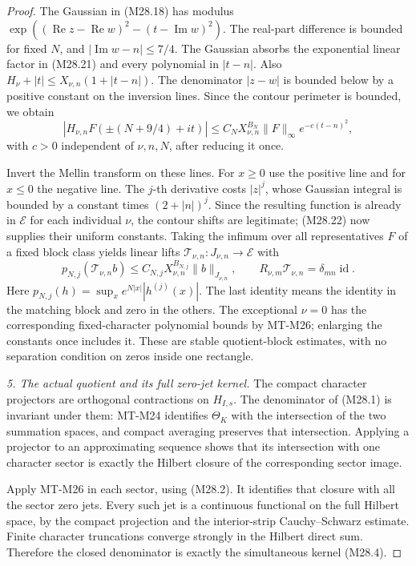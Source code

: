 \begin{proof}
The Gaussian in (M28.18) has modulus
\(\exp((\operatorname{Re}z-\operatorname{Re}w)^2
       -(t-\operatorname{Im}w)^2)\).
The real-part difference is bounded for fixed
\(N\), and
\(|\operatorname{Im}w-n|\le7/4\). The Gaussian
absorbs the exponential linear factor in
(M28.21) and every polynomial in \(|t-n|\).
Also \(H_\nu+|t|\le X_{\nu,n}(1+|t-n|)\).
The denominator \(|z-w|\) is bounded below
by a positive constant on the inversion lines.
Since the contour perimeter is bounded, we obtain
\[
 |H_{\nu,n}F(\pm(N+9/4)+it)|
 \le C_N X_{\nu,n}^{B_N}\|F\|_\infty
                              e^{-c(t-n)^2},                 \tag{M28.22}
\]
with \(c>0\) independent of \(\nu,n,N\), after
reducing it once.

Invert the Mellin transform on these lines.
For \(x\ge0\) use the positive line and for
\(x\le0\) the negative line. The \(j\)-th
derivative costs \(|z|^j\), whose Gaussian
integral is bounded by a constant times
\((2+|n|)^j\). Since the resulting function
is already in \(\mathcal E\) for each
individual \(\nu\), the contour shifts are
legitimate; (M28.22) now supplies their
uniform constants. Taking the infimum over
all representatives \(F\) of a fixed block
class yields linear lifts
\(\mathcal T_{\nu,n}:J_{\nu,n}\to\mathcal E\)
with
\[
 p_{N,j}(\mathcal T_{\nu,n}b)
       \le C_{N,j}X_{\nu,n}^{B_{N,j}}\|b\|_{J_{\nu,n}},
 \qquad R_{\nu,m}\mathcal T_{\nu,n}=\delta_{mn}\operatorname{id}.
                                                               \tag{M28.23}
\]
Here \(p_{N,j}(h)=\sup_x e^{N|x|}|h^{(j)}(x)|\).
The last identity means the identity in the
matching block and zero in the others.
The exceptional \(\nu=0\) has the corresponding
fixed-character polynomial bounds by MT-M26;
enlarging the constants once includes it.
These are stable quotient-block estimates,
with no separation condition on zeros inside
one rectangle.

\emph{5. The actual quotient and its full zero-jet kernel.}
The compact character projectors are orthogonal
contractions on \(H_{I,s}\). The denominator
of (M28.1) is invariant under them: MT-M24
identifies \(\Theta_K\) with the intersection
of the two summation spaces, and compact
averaging preserves that intersection. Applying
a projector to an approximating sequence
shows that its intersection with one character
sector is exactly the Hilbert closure of the
corresponding sector image.

Apply MT-M26 in each sector, using (M28.2).
It identifies that closure with all the
sector zero jets. Every such jet is a
continuous functional on the full Hilbert
space, by the compact projection and the
interior-strip Cauchy--Schwarz estimate.
Finite character truncations converge
strongly in the Hilbert direct sum.
Therefore the closed denominator is exactly
the simultaneous kernel (M28.4).


\end{proof}
